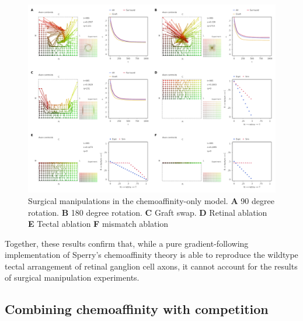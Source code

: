 \documentclass[11pt, a4paper, draft]{article}
\begin{document}
%
%
\begin{figure}
\includegraphics[width=0.95\linewidth]{./images/fig_chemo_manipulations.png}
\caption{Surgical manipulations in the chemoaffinity-only model. \textbf{A} 90 degree
rotation. \textbf{B} 180 degree rotation. \textbf{C} Graft swap. \textbf{D}
Retinal ablation \textbf{E} Tectal ablation \textbf{F} mismatch ablation}
\label{f:Gsurg}
\end{figure}

Together, these results confirm that, while a pure gradient-following
implementation of Sperry's chemoaffinity theory is able to reproduce the
wildtype tectal arrangement of retinal ganglion cell axons, it cannot account
for the results of surgical manipulation experiments.

\subsection*{Combining chemoaffinity with competition}
\end{document}
